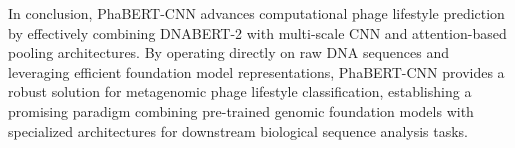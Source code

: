 \documentclass[runningheads]{llncs}
\begin{document}
In conclusion, PhaBERT-CNN advances computational phage lifestyle prediction by effectively combining DNABERT-2 with multi-scale CNN and attention-based pooling architectures. By operating directly on raw DNA sequences and leveraging efficient foundation model representations, PhaBERT-CNN provides a robust solution for metagenomic phage lifestyle classification, establishing a promising paradigm combining pre-trained genomic foundation models with specialized architectures for downstream biological sequence analysis tasks.




\end{document}

